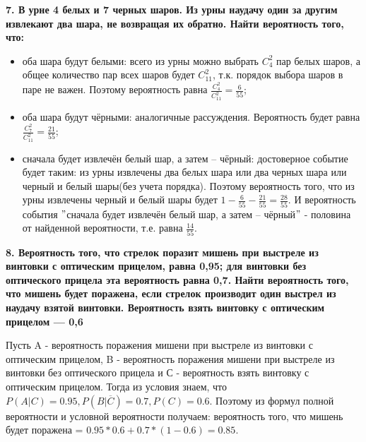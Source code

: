 \documentclass{article}
\begin{document}
\noindent \textbf{7. В урне 4 белых и 7 черных шаров. Из урны наудачу один за другим извлекают два шара, не возвращая их обратно. Найти вероятность того, что:}

\begin{itemize}
\item оба шара будут белыми: всего из урны можно выбрать $C^2_4$ пар белых шаров, а общее количество пар всех шаров будет $C^2_{11}$, т.к. порядок выбора шаров в паре не важен. Поэтому вероятность равна $\frac{C^2_4}{C_{11}^2} = \frac{6}{55}$;

\item оба шара будут чёрными: аналогичные рассуждения. Вероятность будет равна $\frac{C^2_7}{C_{11}^2} = \frac{21}{55}$;

\item сначала будет извлечён белый шар, а затем – чёрный: достоверное событие будет таким: из урны извлечены два белых шара или два черных шара или черный и белый шары(без учета порядка). Поэтому вероятность того, что из урны извлечены черный и белый шары будет $1 - \frac{6}{55} - \frac{21}{55} = \frac{28}{55}$. И вероятность события $"$сначала будет извлечён белый шар, а затем – чёрный$"$ - половина от найденной вероятности, т.е. равна $\frac{14}{55}$.
\end{itemize}

\noindent \textbf{8. Вероятность того, что стрелок поразит мишень при выстреле из винтовки с оптическим прицелом, равна 0,95; для винтовки без оптического прицела эта вероятность равна 0,7. Найти вероятность того, что мишень будет поражена, если стрелок производит один выстрел из наудачу взятой винтовки. Вероятность взять винтовку с оптическим прицелом — 0,6}

Пусть A - вероятность поражения мишени при выстреле из винтовки с оптическим прицелом, B - вероятность поражения мишени при выстреле из винтовки без оптического прицела и С - вероятность взять винтовку с оптическим прицелом. Тогда из условия знаем, что $P(A|C) = 0.95, P(B|\overline{C}) = 0.7, P(C) = 0.6$. Поэтому из формул полной вероятности и условной вероятности получаем: вероятность того, что мишень будет поражена = $0.95 * 0.6 + 0.7 * (1 - 0.6) = 0.85$.
\end{document}
